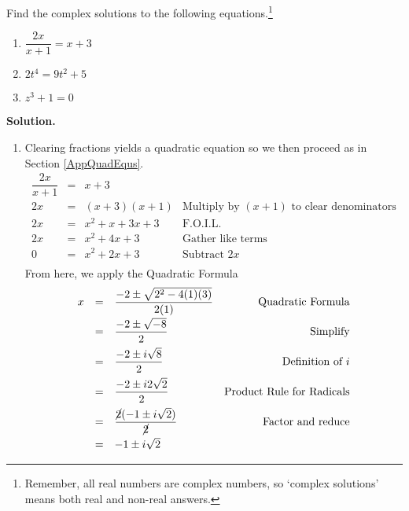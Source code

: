\documentclass{ximera}
\begin{document}
\begin{ex} \label{complexsolnsreviewex}  Find the complex solutions to the following equations.\footnote{Remember, all real numbers are complex numbers, so `complex solutions' means both real and non-real answers.} 

\begin{multicols}{3}
\begin{enumerate}


\item  $\dfrac{2x}{x+1} = x+3$

\item $2t^4 = 9t^2 + 5$

\item  $z^3 + 1 = 0$

\end{enumerate}
\end{multicols}

{\bf Solution.}

\begin{enumerate}

\enlargethispage{20pt}

\item  Clearing fractions yields a quadratic equation so we then proceed as in Section \ref{AppQuadEqus}.\[ \begin{array}{rclr}


\dfrac{2x}{x+1} & = &  x+3 & \\[5pt]
2x & = & (x+3)(x+1) & \text{Multiply by $(x+1)$ to clear denominators} \\

2x & = & x^2 + x + 3x + 3 & \text{F.O.I.L.} \\

2x & = & x^2 + 4x + 3 & \text{Gather like terms} \\

0 & = & x^2 + 2x + 3 & \text{Subtract $2x$} \\

\end{array}\] From here, we apply the Quadratic Formula \[ \begin{array}{rclr}

x  & =  & \dfrac{-2 \pm \sqrt{2^2 - 4(1)(3)}}{2(1)}  & \text{Quadratic Formula}\\[8pt]
    & = &  \dfrac{-2 \pm \sqrt{-8}}{2} & \text{Simplify}\\[8pt]
		& =  & \dfrac{-2 \pm i \sqrt{8}}{2} & \text{Definition of $i$}\\[8pt]
		& =  & \dfrac{-2 \pm i 2\sqrt{2}}{2} & \text{Product Rule for Radicals}\\[8pt]
		& = & \dfrac{\cancel{2}(-1 \pm i\sqrt{2})}{\cancel{2}} & \text{Factor and reduce}\\[8pt]
		& = & -1 \pm i \sqrt{2} & \\
		\end{array} \]
		

\end{enumerate}
\end{ex}
\end{document}
